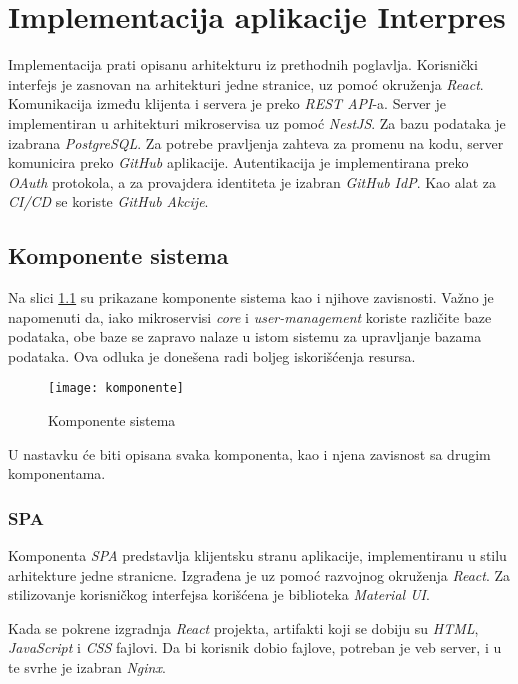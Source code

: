 \chapter{Implementacija aplikacije Interpres}\label{ch:impl}

Implementacija prati opisanu arhitekturu iz prethodnih poglavlja. 
Korisnički interfejs je zasnovan na arhitekturi jedne stranice, 
uz pomoć okruženja \textit{React}. Komunikacija između klijenta i servera 
je preko \textit{REST API}-a. Server je implementiran u arhitekturi
mikroservisa uz pomoć \textit{NestJS}. Za bazu podataka 
je izabrana \textit{PostgreSQL}. Za potrebe pravljenja zahteva za promenu 
na kodu, server komunicira preko \textit{GitHub} aplikacije. Autentikacija 
je implementirana preko \textit{OAuth} protokola, a za provajdera 
identiteta je izabran \textit{GitHub IdP}. Kao alat za \textit{CI/CD} se koriste 
\textit{GitHub Akcije}. 


\section{Komponente sistema}

Na slici \ref{fig:komponente} su prikazane komponente sistema kao i
njihove zavisnosti. Važno je napomenuti da, iako mikroservisi \textit{core} i 
\textit{user-management} koriste različite baze podataka,
obe baze se zapravo nalaze u istom sistemu za upravljanje bazama podataka. 
Ova odluka je donešena radi boljeg iskorišćenja resursa. 

\begin{figure}[h]
  \centering
  \texttt{[image: komponente]}
  \caption{Komponente sistema}
  \label{fig:komponente}
\end{figure}

U nastavku će biti opisana svaka komponenta, kao i njena 
zavisnost sa drugim komponentama.

\subsection{SPA}
Komponenta \textit{SPA} predstavlja klijentsku stranu aplikacije, implementiranu 
u stilu arhitekture jedne stranicne. Izgrađena je 
uz pomoć razvojnog okruženja \textit{React}. Za stilizovanje korisničkog 
interfejsa korišćena je biblioteka \textit{Material UI}. 

Kada se pokrene izgradnja \textit{React} projekta, artifakti koji se dobiju 
su \textit{HTML}, \textit{JavaScript} i \textit{CSS} fajlovi. Da bi korisnik dobio fajlove, 
potreban je veb server, i u te svrhe je izabran \textit{Nginx}.

